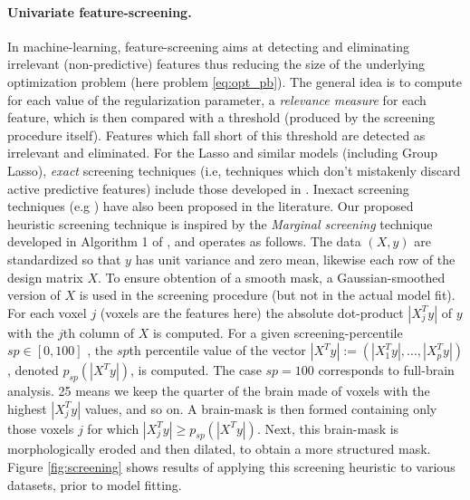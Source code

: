 \paragraph{Univariate feature-screening.}
In machine-learning, feature-screening aims at detecting and
eliminating irrelevant (non-predictive)
features thus reducing the size of the underlying
optimization problem (here problem \eqref{eq:opt_pb}). The general idea
is to compute for each value of the regularization parameter, a
\textit{relevance measure} for each feature, which is then compared with a
threshold (produced by the screening procedure itself). Features which fall short
of this threshold are detected as irrelevant and eliminated. For the
Lasso and similar models (including Group Lasso),
\textit{exact}
screening techniques (i.e, techniques
  which don't mistakenly discard active predictive features) include those developed in
 \citep{elghaoui2010,lee2014exact,liu2014safe,wang2015lasso}. Inexact
screening techniques (e.g  \citep{tibshirani2010strong}) have also been
proposed in the literature.
Our proposed heuristic screening technique is inspired by the
\textit{Marginal screening} technique developed in Algorithm 1 of
 \citep{lee2014exact}, and operates as
follows. The data $(X,y)$ are standardized so that $y$ has unit
variance and zero mean, likewise each row of the design matrix $X$. To
ensure obtention of a smooth mask, a Gaussian-smoothed version
of $X$ is used in the screening procedure (but not in the actual model
fit).
For each voxel $j$ (voxels are the features here) the
absolute dot-product $|X^T_jy|$ of $y$ with the $j$th column of
$X$ is computed.
For a given screening-percentile
$sp \in [0, 100]$ , the $sp$th percentile value of the
vector $|X^Ty| := (|X^T_1y|, ..., |X^T_py|)$, denoted $p_{sp}(|X^Ty|)$,
is computed. The case $sp=100$ corresponds to full-brain analysis. 25
means we keep the quarter of the brain made of voxels with the highest
$|X^T_jy|$ values, and so on.
A brain-mask is then formed containing only those voxels $j$
for which $|X^T_jy| \ge p_{sp}(|X^Ty|)$. Next, this brain-mask is
morphologically eroded
and then
dilated, to obtain a more structured mask.  Figure
\ref{fig:screening} shows results of applying this screening heuristic
to various datasets, prior to model fitting.

